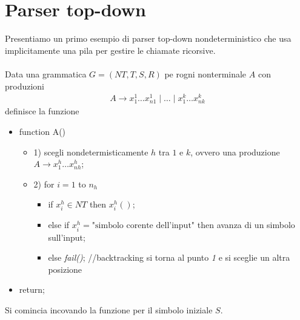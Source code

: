 \documentclass[a4paper,12pt]{article}
\begin{document}
{\section{Parser top-down}
Presentiamo un primo esempio di parser top-down nondeterministico che usa implicitamente una pila per gestire le chiamate ricorsive. \\
\vspace{5px}\\
Data una grammatica $G = (NT, T, S, R)$ pe rogni nonterminale $A$ con produzioni
\begin{align*}
  A \to x_1^1 \dots x_{n1}^1 \mid \dots \mid x_1^k \dots x_{nk}^k
\end{align*}
definisce la funzione
\begin{itemize}
  \item function A()
  \begin{itemize}
    \item 1) scegli nondetermisticamente $h$ tra $1$ e $k$, ovvero una produzione $A \to x_1^h \dots x_{nh}^h$;
    \item 2) for $i=1$ to $n_h$
    \begin{itemize}
      \item if $x_i^h \in NT$ then $x_i^h()$;
      \item else if $x_i^h = \text{"simbolo corente dell'input"}$ then avanza di un simbolo sull'input;
      \item else \textit{fail()}; //backtracking si torna al punto \textit{1} e si sceglie un altra posizione
    \end{itemize}
  \end{itemize}
  \item return;
\end{itemize}
Si comincia incovando la funzione per il simbolo iniziale $S$. \\
\vspace{1em} \\
}
\end{document}
